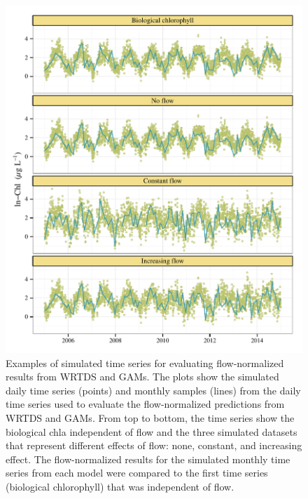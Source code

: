 \documentclass[letterpaper,12pt,oneside]{article}\usepackage[]{graphicx}\usepackage[]{color}
\makeatletter
\def\maxwidth{ %
  \ifdim\Gin@nat@width>\linewidth
    \linewidth
  \else
    \Gin@nat@width
  \fi
}
\makeatother
\begin{document}
\begin{figure}[!ht]

{\centering \includegraphics[width=\maxwidth]{figs/simex-1} 

}

\caption{Examples of simulated time series for evaluating flow-normalized results from \ac{WRTDS} and \acp{GAM}.  The plots show the simulated daily time series (points) and monthly samples (lines) from the daily time series used to evaluate the flow-normalized predictions from \ac{WRTDS} and \acp{GAM}.  From top to bottom, the time series show the biological \ac{chla} independent of flow and the three simulated datasets that represent different effects of flow: none, constant, and increasing effect.  The flow-normalized results for the simulated monthly time series from each model were compared to the first time series (biological chlorophyll) that was independent of flow.}\label{fig:simex}
\end{figure}
\end{document}
